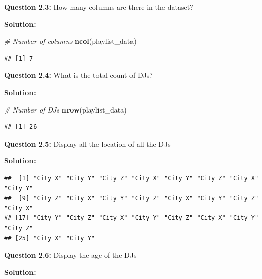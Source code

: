 \documentclass[
]{article}
\newenvironment{Shaded}{\begin{snugshade}}{\end{snugshade}}
\newcommand{\CommentTok}[1]{\textcolor[rgb]{0.56,0.35,0.01}{\textit{#1}}}
\newcommand{\FunctionTok}[1]{\textcolor[rgb]{0.13,0.29,0.53}{\textbf{#1}}}
\newcommand{\NormalTok}[1]{#1}
\newcommand{\SpecialCharTok}[1]{\textcolor[rgb]{0.81,0.36,0.00}{\textbf{#1}}}
\begin{document}
\textbf{Question 2.3:} How many columns are there in the dataset?

\textbf{Solution:}

\begin{Shaded}
\begin{Highlighting}[]
\CommentTok{\# Number of columns}
\FunctionTok{ncol}\NormalTok{(playlist\_data)}
\end{Highlighting}
\end{Shaded}

\begin{verbatim}
## [1] 7
\end{verbatim}

\textbf{Question 2.4:} What is the total count of DJs?

\textbf{Solution:}

\begin{Shaded}
\begin{Highlighting}[]
\CommentTok{\# Number of DJs}
\FunctionTok{nrow}\NormalTok{(playlist\_data)}
\end{Highlighting}
\end{Shaded}

\begin{verbatim}
## [1] 26
\end{verbatim}

\textbf{Question 2.5:} Display all the location of all the DJs

\textbf{Solution:}

\begin{Shaded}
\end{Shaded}

\begin{verbatim}
##  [1] "City X" "City Y" "City Z" "City X" "City Y" "City Z" "City X" "City Y"
##  [9] "City Z" "City X" "City Y" "City Z" "City X" "City Y" "City Z" "City X"
## [17] "City Y" "City Z" "City X" "City Y" "City Z" "City X" "City Y" "City Z"
## [25] "City X" "City Y"
\end{verbatim}

\textbf{Question 2.6:} Display the age of the DJs

\textbf{Solution:}

\begin{Shaded}
\end{Shaded}
\end{document}
